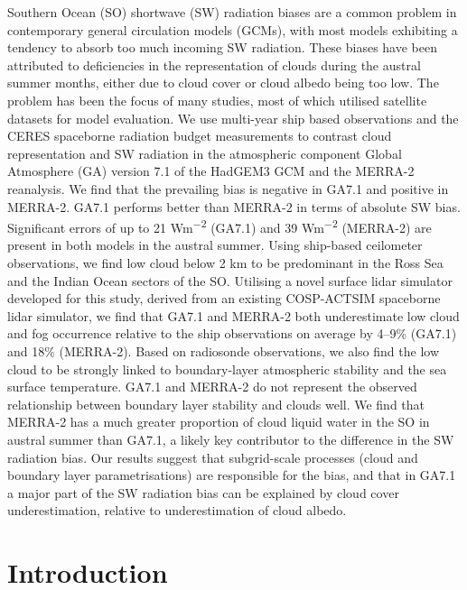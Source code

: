 Southern Ocean (SO) shortwave (SW) radiation biases are a common problem in
contemporary general circulation models (GCMs), with most models exhibiting a
tendency to absorb too much incoming SW radiation. These biases have been
attributed to deficiencies in the representation of clouds during the austral
summer months, either due to cloud cover or cloud albedo being too low. The
problem has been the focus of many studies, most of which utilised satellite
datasets for model evaluation. We use multi-year ship based observations and
the CERES spaceborne radiation budget measurements to contrast cloud
representation and SW radiation in the atmospheric component Global Atmosphere
(GA) version 7.1 of the HadGEM3 GCM and the MERRA-2 reanalysis. We find that
the prevailing bias is negative in GA7.1 and positive in MERRA-2. GA7.1
performs better than MERRA-2 in terms of absolute SW bias. Significant errors
of up to 21 \unit{Wm^{-2}} (GA7.1) and 39 \unit{Wm^{-2}} (MERRA-2) are present
in both models in the austral summer. Using ship-based ceilometer observations,
we find low cloud below 2 \unit{km} to be predominant in the Ross Sea and the
Indian Ocean sectors of the SO. Utilising a novel surface lidar simulator
developed for this study, derived from an existing COSP-ACTSIM spaceborne lidar
simulator, we find that GA7.1 and MERRA-2 both underestimate low cloud and fog
occurrence relative to the ship observations on average by 4--9\% (GA7.1) and
18\% (MERRA-2). Based on radiosonde observations, we also find the low cloud
to be strongly linked to boundary-layer atmospheric stability and the sea
surface temperature. GA7.1 and MERRA-2 do not represent the observed
relationship between boundary layer stability and clouds well. We find that
MERRA-2 has a much greater proportion of cloud liquid water in the SO in
austral summer than GA7.1, a likely key contributor to the difference in the SW
radiation bias. Our results suggest that subgrid-scale processes (cloud and
boundary layer parametrisations) are responsible for the bias, and that in
GA7.1 a major part of the SW radiation bias can be explained by cloud cover
underestimation, relative to underestimation of cloud albedo.

\section{Introduction}

